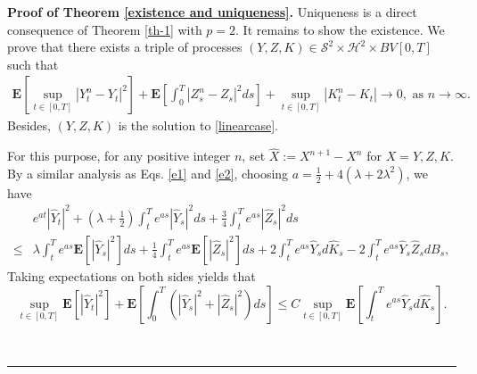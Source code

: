 \documentclass[10pt]{article}%
\numberwithin{equation}{section}
\newenvironment{proof}[1][Proof]{\noindent \textbf{#1.} }{\  \rule{0.5em}{0.5em}}
\def \E{\mathbf{E}}
\begin{document}



\begin{proof}[Proof of Theorem \ref{existence and uniqueness}]
Uniqueness is a direct consequence of Theorem \ref{th-1} with $p=2$. It remains to show the existence. We prove that there exists a triple of processes $(Y,Z,K)\in\mathcal{S}^2\times \mathcal{H}^2\times BV[0,T]$ such that
\begin{align}\label{equation6.25}
\E\left[\sup_{t\in[0,T]}\left|Y_t^n-Y_t\right|^2\right]+\E\left[\int_0^T \left|Z_s^n-Z_s\right|^2 ds\right]+\sup_{t\in[0,T]}\left|K^n_t-K_t\right|\rightarrow 0, \textrm{ as } n\rightarrow \infty.
\end{align} 
Besides, $(Y,Z,K)$ is the solution to \eqref{linearcase}.

For this purpose, for any positive integer $n$,  set $\hat{X}:=X^{n+1}-X^n$ for $X=Y,Z,K$. By a similar analysis as Eqs. \eqref{e1} and \eqref{e2}, choosing $a=\frac{1}{2}+4(\lambda+2\lambda^2)$, we have
\begin{align*}
&e^{at}|\hat{Y}_t|^2+\left(\lambda+\frac{1}{2}\right)\int_t^T e^{as} |\hat{Y}_s|^2ds +\frac{3}{4}\int_t^T e^{as}|\hat{Z}_s|^2ds\\
\leq &\lambda\int_t^T e^{as} \E[|\hat{Y}_s|^2]ds +\frac{1}{4}\int_t^T e^{as}\E[|\hat{Z}_s|^2]ds+2\int_t^T e^{as}\hat{Y}_sd\hat{K}_s-2\int_t^T e^{as}\hat{Y}_s\hat{Z}_sdB_s,
\end{align*}
Taking expectations on both sides yields that 
\begin{equation}\label{e30}
\sup_{t\in[0,T]}\E[|\hat{Y}_t|^2]+\E\left[\int_0^T (|\hat{Y}_s|^2+|\hat{Z}_s|^2)ds\right]\leq C\sup_{t\in[0,T]}\E\left[\int_t^T e^{as}\hat{Y}_sd\hat{K}_s\right].
\end{equation}


\end{proof}
\end{document}
